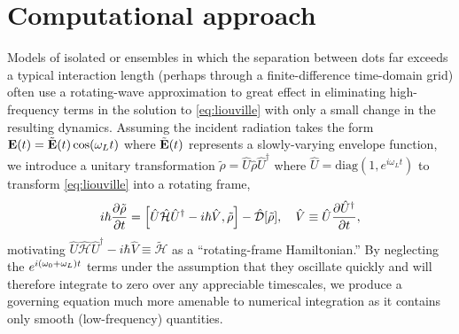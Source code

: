 \section{Computational approach}


Models of isolated \qds{} or \qd{} ensembles in which the separation between dots far exceeds a typical interaction length (perhaps through a finite-difference time-domain grid) often use a rotating-wave approximation to great effect in eliminating high-frequency terms in the solution to \cref{eq:liouville} with only a small change in the resulting dynamics.
Assuming the incident radiation takes the form $\vb{E}(t) = \tilde{\vb{E}}(t) \cos(\omega_L t)$
where $\tilde{\vb{E}}(t)$ represents a slowly-varying envelope function, we introduce a unitary transformation $\tilde{\rho} = \hat{U} \hat{\rho} \hat{U}^\dagger$ where $\hat{U} = \mathrm{diag}(1, e^{i \omega_L t})$ to transform \cref{eq:liouville} into a rotating frame,
\begin{equation}
  i \hbar \pdv{\tilde{\rho}}{t} = \commutator{\hat{U} \hat{\mathcal{H}} \hat{U}^\dagger - i \hbar \hat{V}}{\tilde{\rho}} - \hat{\mathcal{D}}\qty[\tilde{\rho}], \quad \hat{V} \equiv \hat{U} \pdv{\hat{U}^\dagger}{t},
  \label{eq:rotating liouville}
\end{equation}
motivating $\hat{U} \hat{\mathcal{H}} \hat{U}^\dagger - i \hbar \hat{V} \equiv \tilde{\mathcal{H}}$ as a ``rotating-frame Hamiltonian.''
By neglecting the $e^{i \qty(\omega_0 + \omega_L) t}$ terms under the assumption that they oscillate quickly and will therefore integrate to zero over any appreciable timescales, we produce a governing equation much more amenable to numerical integration as it contains only smooth (low-frequency) quantities.


